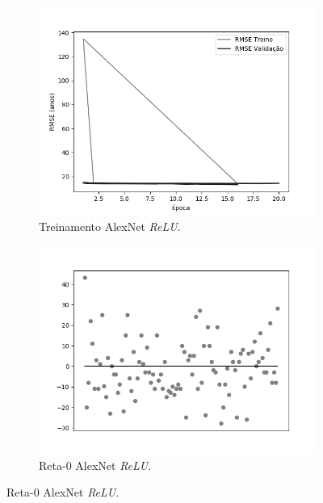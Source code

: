 	\begin{figure}[hb!]
		\caption{Resultados do treinamento e teste da CNN AlexNet.}\label{fig:alexnet-abordagem1}
		\begin{subfigure}[hb]{0.5\linewidth}
			\caption{Treinamento AlexNet \emph{ReLU}.}
			\label{fig:redeneuralbiologica}
			\includegraphics[width=\linewidth]{img/graficos/history/alexnet/fig-history-image-treat-2-alexnet-relu-rmse.png}
		\end{subfigure}
		\begin{subfigure}[hb]{0.5\linewidth}
			\caption{Reta-0 AlexNet \emph{ReLU}.}
			\label{fig:reta0reludying}
			\includegraphics[width=\linewidth]{img/graficos/reta0/alexnet/fig-reta-0-image-treat-2-alexnet-relu.png}%

\end{subfigure}
\end{figure}
